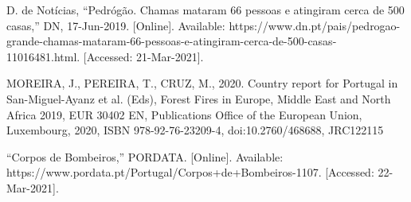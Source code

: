 \documentclass[a4paper,12pt]{scrreprt}
\begin{document}

\renewcommand\bibname{Referências}

\begin{thebibliography}{9}

D. de Notícias, “Pedrógão. Chamas mataram 66 pessoas e atingiram cerca de 500 casas,” DN, 17-Jun-2019. [Online]. Available: https://www.dn.pt/pais/pedrogao-grande-chamas-mataram-66-pessoas-e-atingiram-cerca-de-500-casas-11016481.html. [Accessed: 21-Mar-2021]. 

MOREIRA, J., PEREIRA, T., CRUZ, M., 2020. Country report for Portugal in San-Miguel-Ayanz et al. (Eds), Forest Fires in Europe, Middle East and North Africa 2019, EUR 30402 EN, Publications Office of the European Union, Luxembourg, 2020, ISBN 978-92-76-23209-4, doi:10.2760/468688, JRC122115

“Corpos de Bombeiros,” PORDATA. [Online]. Available: https://www.pordata.pt/Portugal/Corpos+de+Bombeiros-1107. [Accessed: 22-Mar-2021]. 

\end{thebibliography}




\renewcommand{\nomname}{Lista de Siglas e Acrónimos}

\renewcommand{\nompreamble}{}



\printnomenclature



\end{document}
